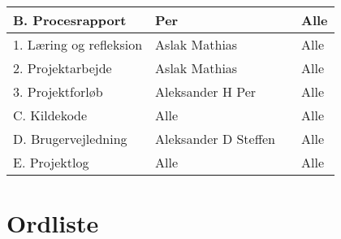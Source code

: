 \begin{center}
\begin{longtable}{|m{5.8cm}|m{3.5cm}|m{3.5cm}|m{3.2cm}|}
B. Procesrapport & Per & & Alle\\ \hline
1. Læring og refleksion & Aslak \newline Mathias & & Alle\\ \hline
2. Projektarbejde &  Aslak \newline Mathias & & Alle\\ \hline
3. Projektforløb & Aleksander H \newline Per & & Alle\\ \hline

C. Kildekode & Alle & & Alle\\ \hline

D. Brugervejledning & Aleksander D \newline Steffen & & Alle\\ \hline

E. Projektlog & Alle & & Alle\\ \hline


\end{longtable}
\end{center}
\newpage
\section{Ordliste}\label{sec:ordliste}

